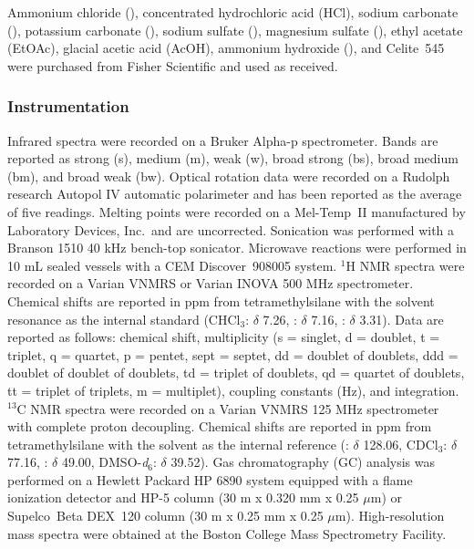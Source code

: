 Ammonium chloride (), concentrated hydrochloric acid (HCl), sodium carbonate
(), potassium carbonate (), sodium sulfate (), magnesium sulfate
(), ethyl acetate (EtOAc), glacial acetic acid (AcOH), ammonium hydroxide (),
and Celite\regtm\  545 were purchased from Fisher Scientific and used as received.

\subsubsection{Instrumentation}
Infrared spectra were recorded on a Bruker Alpha-p spectrometer. Bands are reported as strong (s),
medium (m), weak (w), broad strong (bs), broad medium (bm), and broad weak (bw). Optical rotation
data were recorded on a Rudolph research Autopol IV automatic polarimeter and has been reported as
the average of five readings. Melting points were recorded on a  Mel-Temp\regtm\  II manufactured by
Laboratory Devices, Inc.~and are uncorrected.
Sonication was performed with a Branson 1510 40 kHz bench-top sonicator. Microwave reactions were
performed in 10 mL sealed vessels with a CEM Discover\regtm\ 908005 system.  $^1$H NMR spectra were
recorded on a Varian VNMRS or Varian INOVA 500 MHz spectrometer.
Chemical shifts are reported in ppm from tetramethylsilane with the solvent resonance as the internal
standard (CHCl$_3$: $\delta$ 7.26, : $\delta$ 7.16, : $\delta$ 3.31). Data are
reported as follows:
chemical shift, multiplicity (s = singlet, d = doublet, t = triplet, q = quartet, p = pentet, sept =
septet, dd = doublet of doublets, ddd = doublet of doublet of doublets, td = triplet of doublets,
qd = quartet of doublets, tt = triplet of triplets, m = multiplet), coupling constants (Hz), and
integration.
$^{13}$C NMR spectra were recorded on a Varian VNMRS 125 MHz spectrometer with complete proton
decoupling.
Chemical shifts are reported in ppm from tetramethylsilane with the solvent as the internal
reference (: $\delta$ 128.06, CDCl$_3$: $\delta$ 77.16, : $\delta$ 49.00,
DMSO-\textit{d}$_6$:
$\delta$ 39.52). Gas chromatography (GC) analysis was performed on a Hewlett Packard HP 6890 system equipped with a flame ionization detector and HP-5
column (30 m x 0.320 mm x 0.25 $\mu$m) or Supelco\texttrademark~Beta DEX\texttrademark~120 column (30 m x 0.25 mm x 0.25 $\mu$m).
High-resolution mass spectra were obtained at the Boston College Mass Spectrometry Facility.


\pagebreak

